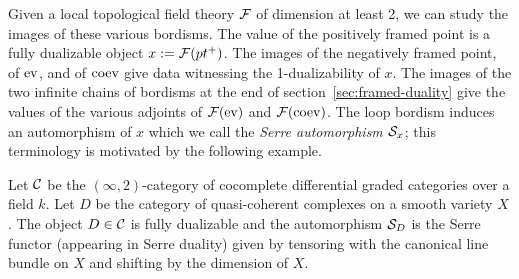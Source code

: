 \documentclass{amsart}
\begin{document}
\begin{center}  
\end{center}

Given a local topological field theory $\mathcal F$ of dimension at least 2, we can study the images of these various bordisms. The value of the positively framed point is a fully dualizable object $x := \mathcal F(pt^+)$.  The images of the negatively framed point, of $\mathrm{ev}$, and of $\mathrm{coev}$ give data witnessing the 1-dualizability of $x$.  The images of the two infinite chains of bordisms at the end of section~\ref{sec:framed-duality} give the values of the various adjoints of $\mathcal F(\mathrm{ev})$ and $\mathcal F(\mathrm{coev})$.  The loop bordism induces an automorphism of $x$ which we call the {\em Serre automorphism $\mathcal S_x$}; this terminology is motivated by the following example.

\begin{example} \label{eg:serrefunctor}
Let $\mathcal C$ be the $(\infty,2)$-category of cocomplete differential graded categories over a field $k$.  Let $D$ be the category of quasi-coherent complexes on a smooth variety $X$.  The object $D \in \mathcal C$ is fully dualizable and the automorphism $\mathcal S_D$ is the Serre functor (appearing in Serre duality) given by tensoring with the canonical line bundle on $X$ and shifting by the dimension of $X$.
\end{example}
\end{document}
